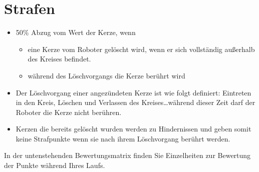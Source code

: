 \documentclass[a4paper,12pt]{article}
\begin{document}
\section{Strafen}
\begin{itemize}
	\item 50\% Abzug vom Wert der Kerze, wenn
	\begin{itemize}
		\item eine Kerze vom Roboter gelöscht wird, wenn er sich vollständig außerhalb des Kreises befindet.
		\item während des Löschvorgangs die Kerze berührt wird
	\end{itemize}
	\item Der Löschvorgang einer angezündeten Kerze ist wie folgt definiert: Eintreten in den Kreis, Löschen und Verlassen des Kreises\ldots während dieser Zeit darf der Roboter die Kerze nicht berühren.
	\item Kerzen die bereits gelöscht wurden werden zu Hindernissen und geben somit keine Strafpunkte wenn sie nach ihrem Löschvorgang berührt werden.
\end{itemize}
In der untenstehenden Bewertungsmatrix finden Sie Einzelheiten zur Bewertung der Punkte während Ihres Laufs.
\end{document}
